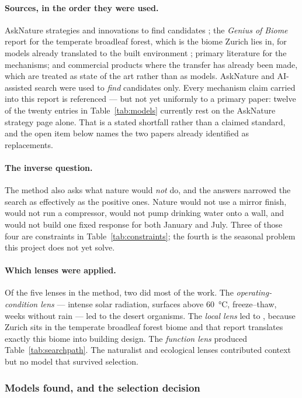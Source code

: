 \paragraph{Sources, in the order they were used.} AskNature strategies and
innovations to find candidates \parencite{asknature}; the \emph{Genius of Biome}
report for the temperate broadleaf forest, which is the biome Zurich lies in,
for models already translated to the built environment \parencite{hok2013};
primary literature for the mechanisms; and commercial products where the
transfer has already been made, which are treated as state of the art rather
than as models. AskNature and AI-assisted search were used to \emph{find} candidates only.
Every mechanism claim carried into this report is referenced --- but not yet
uniformly to a primary paper: twelve of the twenty entries in
Table~\ref{tab:models} currently rest on the AskNature strategy page alone. That
is a stated shortfall rather than a claimed standard, and the open item below
names the two papers already identified as replacements.

\paragraph{The inverse question.} The method also asks what nature would
\emph{not} do, and the answers narrowed the search as effectively as the
positive ones. Nature would not use a mirror finish, would not run a compressor,
would not pump drinking water onto a wall, and would not build one fixed
response for both January and July. Three of those four are constraints in
Table~\ref{tab:constraints}; the fourth is the seasonal problem this project
does not yet solve.

\paragraph{Which lenses were applied.} Of the five lenses in the method, two did
most of the work. The \emph{operating-condition lens} — intense solar radiation,
surfaces above \qty{60}{\celsius}, freeze--thaw, weeks without rain — led to the
desert organisms. The \emph{local lens} led to \parencite{hok2013}, because
Zurich sits in the temperate broadleaf forest biome and that report translates
exactly this biome into building design. The \emph{function lens} produced
Table~\ref{tab:searchpath}. The naturalist and ecological lenses contributed
context but no model that survived selection.

\subsubsection{Models found, and the selection decision}

